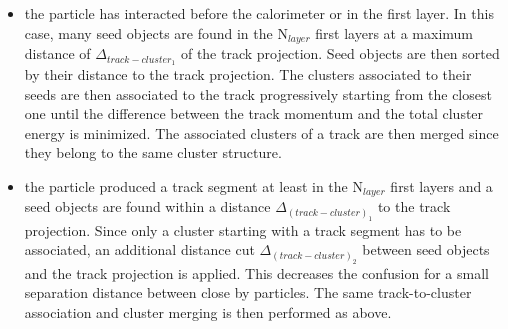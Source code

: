 \documentclass[cits]{JINST}
\begin{document}
\begin{itemize}
  \item the particle has interacted before the calorimeter or in the first layer. In this case, many seed objects are found in the N$_{layer}$ first layers at a maximum distance of $\Delta_{{track-cluster}_1}$ of the track projection. Seed objects are then sorted by their distance to the track projection. The clusters associated to their seeds are then associated to the track progressively starting from the closest one until the difference between the track momentum and the total cluster energy is minimized. The associated clusters of a track are then merged since they belong to the same cluster structure.
  \item the particle produced a track segment at least in the N$_{layer}$ first layers and a seed objects are found within a distance $\Delta_{(track-cluster)_1}$ to the track projection. Since only a cluster starting with a track segment has to be associated, an additional distance cut $\Delta_{(track-cluster)_2}$ between seed objects and the track projection is applied. This decreases the confusion for a small separation distance between close by particles. The same track-to-cluster association and cluster merging is then performed as above.
\end{itemize}
\end{document}

